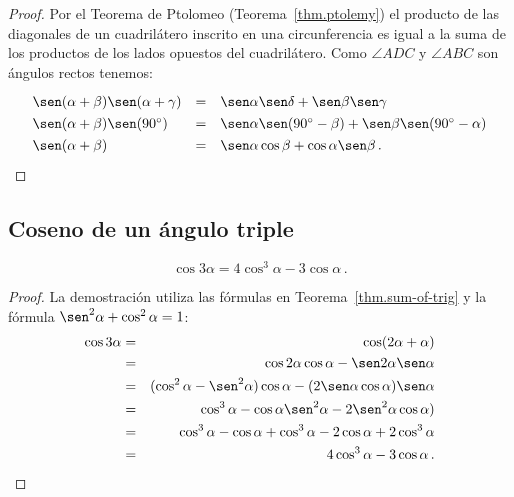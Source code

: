 \begin{proof}
Por el Teorema de Ptolomeo (Teorema~\ref{thm.ptolemy}) el producto de las diagonales de un cuadrilátero inscrito en una circunferencia es igual a la suma de los productos de los lados opuestos del cuadrilátero. Como $\angle ADC$ y $\angle ABC$ son ángulos rectos tenemos:
\[
\renewcommand{\arraystretch}{1.3}
\begin{array}{lcl}
\sen (\alpha+\beta)\sen(\alpha+\gamma)&=&
\sen \alpha \sen\delta + \sen \beta\sen \gamma\\
\sen (\alpha+\beta)\sen(90^\circ)&=&
\sen \alpha \sen(90^\circ-\beta) + \sen \beta\sen (90^\circ-\alpha)\\
\sen (\alpha+\beta)&=&\sen\alpha\cos\beta+\cos\alpha\sen \beta\,.
\end{array}
\]
\end{proof}


\subsection{Coseno de un ángulo triple}\label{s.cosine}
\begin{theorem}\label{thm.triple-angle}
\[
\cos 3\alpha=4\cos^3\alpha -3\cos\alpha\,.
\]
\end{theorem}
\begin{proof}
La demostración utiliza las fórmulas en Teorema~\ref{thm.sum-of-trig} y la fórmula $\sen^2\alpha+\cos^2\alpha=1$:
\begin{eqnarray*}
\cos 3\alpha &=& \cos (2\alpha +\alpha)\\
&=& \cos 2\alpha\cos\alpha - \sen 2\alpha\sen\alpha\\
&=& (\cos^2\alpha -\sen^2\alpha)\cos\alpha - (2\sen\alpha\cos\alpha)\sen\alpha\\
&=&\cos^3\alpha - \cos\alpha\sen^2\alpha -2\sen^2\alpha\cos\alpha)\\
&=&\cos^3\alpha - \cos\alpha +\cos^3\alpha -2\cos\alpha+2\cos^3\alpha\\
&=&4\cos^3\alpha -3\cos\alpha\,.
\end{eqnarray*}
\end{proof}


